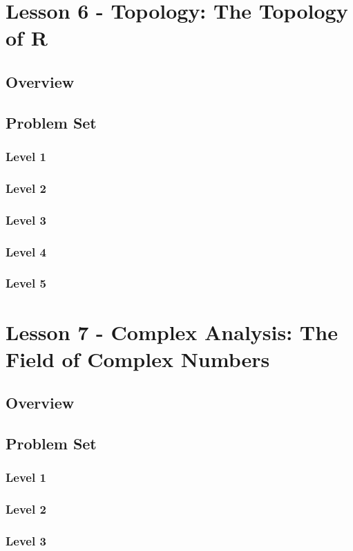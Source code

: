 \documentclass{article}
\begin{document}
\section{Lesson 6 - Topology: The Topology of R}
\subsection{Overview}
\subsection{Problem Set}
\subsubsection{Level 1}
\subsubsection{Level 2}
\subsubsection{Level 3}
\subsubsection{Level 4}
\subsubsection{Level 5}
\pagebreak

\section{Lesson 7 - Complex Analysis: The Field of Complex Numbers}
\subsection{Overview}
\subsection{Problem Set}
\subsubsection{Level 1}
\subsubsection{Level 2}
\subsubsection{Level 3}
\end{document}
